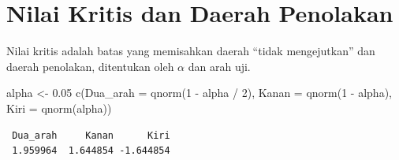\documentclass[
  indonesian,
  letterpaper,
]{book}
\newenvironment{Shaded}{\begin{snugshade}}{\end{snugshade}}
\newcommand{\AttributeTok}[1]{\textcolor[rgb]{0.40,0.45,0.13}{#1}}
\newcommand{\DecValTok}[1]{\textcolor[rgb]{0.68,0.00,0.00}{#1}}
\newcommand{\FloatTok}[1]{\textcolor[rgb]{0.68,0.00,0.00}{#1}}
\newcommand{\FunctionTok}[1]{\textcolor[rgb]{0.28,0.35,0.67}{#1}}
\newcommand{\NormalTok}[1]{\textcolor[rgb]{0.00,0.23,0.31}{#1}}
\newcommand{\OtherTok}[1]{\textcolor[rgb]{0.00,0.23,0.31}{#1}}
\newcommand{\SpecialCharTok}[1]{\textcolor[rgb]{0.37,0.37,0.37}{#1}}
\begin{document}
\section{Nilai Kritis dan Daerah
Penolakan}\label{nilai-kritis-dan-daerah-penolakan}

Nilai kritis adalah batas yang memisahkan daerah ``tidak mengejutkan''
dan daerah penolakan, ditentukan oleh \(\alpha\) dan arah uji.

\begin{Shaded}
\begin{Highlighting}[]
\NormalTok{alpha }\OtherTok{\textless{}{-}} \FloatTok{0.05}
\FunctionTok{c}\NormalTok{(}\AttributeTok{Dua\_arah =} \FunctionTok{qnorm}\NormalTok{(}\DecValTok{1} \SpecialCharTok{{-}}\NormalTok{ alpha }\SpecialCharTok{/} \DecValTok{2}\NormalTok{), }\AttributeTok{Kanan =} \FunctionTok{qnorm}\NormalTok{(}\DecValTok{1} \SpecialCharTok{{-}}\NormalTok{ alpha), }\AttributeTok{Kiri =} \FunctionTok{qnorm}\NormalTok{(alpha))}
\end{Highlighting}
\end{Shaded}

\begin{verbatim}
 Dua_arah     Kanan      Kiri 
 1.959964  1.644854 -1.644854 
\end{verbatim}
\end{document}
